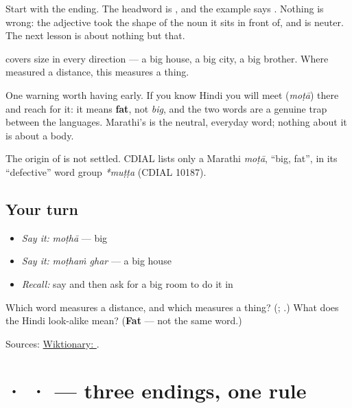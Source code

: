 Start with the ending. The headword is \textbf{}, and the example says \textbf{}. Nothing is wrong: the adjective took the shape of the noun it sits in front of, and \textbf{} is neuter. The next lesson is about nothing but that.

\textbf{} covers size in every direction — a big house, a big city, a big brother. Where \textbf{} measured a distance, this measures a thing.

One warning worth having early. If you know Hindi you will meet \textbf{} (\emph{moṭā}) there and reach for it: it means \textbf{fat}, not \emph{big}, and the two words are a genuine trap between the languages. Marathi's \textbf{} is the neutral, everyday word; nothing about it is about a body.

\begin{cousinweb}
The origin of \textbf{} is not settled. CDIAL lists only a Marathi \emph{moṭā}, \textquotedblleft{}big, fat\textquotedblright{}, in its \textquotedblleft{}defective\textquotedblright{} word group \emph{*muṭṭa} (CDIAL 10187).
\end{cousinweb}

\subsection*{Your turn}
\begin{itemize}
\raggedright
  \item \emph{Say it:} \emph{moṭhā} — big
  \item \emph{Say it:} \emph{moṭhaṁ ghar} — a big house
  \item \emph{Recall:} say \textbf{} and then ask for a big room to do it in
\end{itemize}

\begin{tcolorbox}[breakable,colback=teal!4,colframe=teal!35!black,title={Before you move on}]
Which word measures a distance, and which measures a thing? (\textbf{}; \textbf{}.) What does the Hindi look-alike \textbf{} mean? (\textbf{Fat} — not the same word.)

Sources: \href{https://en.wiktionary.org/wiki/\%E0\%A4\%AE\%E0\%A5\%8B\%E0\%A4\%A0\%E0\%A4\%BE}{Wiktionary: }.
\end{tcolorbox}
\section[\texorpdfstring{\mr{मोठा} · \mr{मोठी} · \mr{मोठं} (moṭhā · moṭhī …)}{मोठा · मोठी · मोठं (moṭhā · moṭhī …)}]{ ·  ·  — three endings, one rule}

